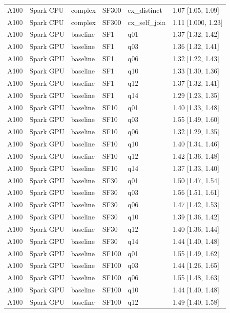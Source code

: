 \begin{longtable}{llllll}
A100 & Spark CPU & complex & SF300 & cx\_distinct & 1.07 [1.05, 1.09] \\
A100 & Spark CPU & complex & SF300 & cx\_self\_join & 1.11 [1.000, 1.23] \\
A100 & Spark GPU & baseline & SF1 & q01 & 1.37 [1.32, 1.42] \\
A100 & Spark GPU & baseline & SF1 & q03 & 1.36 [1.32, 1.41] \\
A100 & Spark GPU & baseline & SF1 & q06 & 1.32 [1.22, 1.43] \\
A100 & Spark GPU & baseline & SF1 & q10 & 1.33 [1.30, 1.36] \\
A100 & Spark GPU & baseline & SF1 & q12 & 1.37 [1.32, 1.41] \\
A100 & Spark GPU & baseline & SF1 & q14 & 1.29 [1.23, 1.35] \\
A100 & Spark GPU & baseline & SF10 & q01 & 1.40 [1.33, 1.48] \\
A100 & Spark GPU & baseline & SF10 & q03 & 1.55 [1.49, 1.60] \\
A100 & Spark GPU & baseline & SF10 & q06 & 1.32 [1.29, 1.35] \\
A100 & Spark GPU & baseline & SF10 & q10 & 1.40 [1.34, 1.46] \\
A100 & Spark GPU & baseline & SF10 & q12 & 1.42 [1.36, 1.48] \\
A100 & Spark GPU & baseline & SF10 & q14 & 1.37 [1.33, 1.40] \\
A100 & Spark GPU & baseline & SF30 & q01 & 1.50 [1.47, 1.54] \\
A100 & Spark GPU & baseline & SF30 & q03 & 1.56 [1.51, 1.61] \\
A100 & Spark GPU & baseline & SF30 & q06 & 1.47 [1.42, 1.53] \\
A100 & Spark GPU & baseline & SF30 & q10 & 1.39 [1.36, 1.42] \\
A100 & Spark GPU & baseline & SF30 & q12 & 1.40 [1.36, 1.44] \\
A100 & Spark GPU & baseline & SF30 & q14 & 1.44 [1.40, 1.48] \\
A100 & Spark GPU & baseline & SF100 & q01 & 1.55 [1.49, 1.62] \\
A100 & Spark GPU & baseline & SF100 & q03 & 1.44 [1.26, 1.65] \\
A100 & Spark GPU & baseline & SF100 & q06 & 1.55 [1.48, 1.63] \\
A100 & Spark GPU & baseline & SF100 & q10 & 1.44 [1.40, 1.48] \\
A100 & Spark GPU & baseline & SF100 & q12 & 1.49 [1.40, 1.58] \\

\end{longtable}

